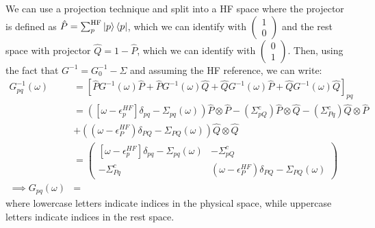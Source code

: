 We can use a projection technique and split into a HF space where the projector is defined as $\hat{P}=\sum_p^{\text{HF}}\ket{p}\bra{p}$, which we can identify with $\begin{pmatrix}1 \\ 0\end{pmatrix}$ and the rest space with projector $\hat{Q}=1-\hat{P}$, which we can identify with $\begin{pmatrix}0 \\ 1\end{pmatrix}$. Then, using the fact that $G^{-1} = G_0^{-1} - \Sigma$ and assuming the HF reference, we can write:
\begin{align}
    G^{-1}_{pq}(\omega) 
&= \left[\hat{P} G^{-1}(\omega) \hat{P} + \hat{P} G^{-1}(\omega) \hat{Q} + \hat{Q} G^{-1}(\omega) \hat{P} + \hat{Q} G^{-1}(\omega) \hat{Q}\right]_{pq} \\
 &= \left(\left[\omega - \epsilon_p^{HF} \right] \delta _{pq}- \Sigma_{pq}(\omega)\right) \hat{P}\otimes \hat{P} - \left(\Sigma^c_{pQ}\right) \hat{P}\otimes \hat{Q} - \left(\Sigma^c_{Pq}\right) \hat{Q}\otimes \hat{P}\\
& + \left( (\omega - \epsilon_P^{HF}) \delta _{PQ} - \Sigma_{PQ}(\omega)\right) \hat{Q}\otimes \hat{Q} \\
&= \begin{pmatrix} \left[\omega - \epsilon_p^{HF} \right] \delta _{pq}- \Sigma_{pq}(\omega) & -\Sigma^c_{pQ} \\ -\Sigma^c_{Pq} & (\omega - \epsilon_P^{HF}) \delta _{PQ} - \Sigma_{PQ}(\omega) \end{pmatrix} \\
\implies G _{pq}(\omega)&=  
\end{align}
where lowercase letters indicate indices in the physical space, while uppercase letters indicate indices in the rest space.

